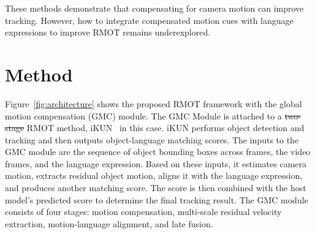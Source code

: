 \documentclass{article}
\makeatletter
\providecommand{\DIFadd}[1]{{\protect\color{blue}\uwave{#1}}} %
\providecommand{\DIFdel}[1]{{\protect\color{red}\sout{#1}}} %
\providecommand{\DIFaddbegin}{} %
\providecommand{\DIFaddend}{} %
\providecommand{\DIFdelbegin}{} %
\providecommand{\DIFdelend}{} %
\providecommand{\DIFscaledelfig}{0.5}
\newlength{\DIFdelgraphicswidth} %
\newlength{\DIFdelgraphicsheight} %
\providecommand{\DIFaddincludegraphics}[2][]{{\color{blue}\fbox{\DIFOincludegraphics[#1]{#2}}}} %
\providecommand{\DIFdelincludegraphics}[2][]{%
\sbox{\DIFdelgraphicsbox}{\DIFOincludegraphics[#1]{#2}}%
\settoboxwidth{\DIFdelgraphicswidth}{\DIFdelgraphicsbox} %
\settoboxtotalheight{\DIFdelgraphicsheight}{\DIFdelgraphicsbox} %
\scalebox{\DIFscaledelfig}{%
\parbox[b]{\DIFdelgraphicswidth}{\usebox{\DIFdelgraphicsbox}\\[-\baselineskip] \rule{\DIFdelgraphicswidth}{0em}}\llap{\resizebox{\DIFdelgraphicswidth}{\DIFdelgraphicsheight}{%
\setlength{\unitlength}{\DIFdelgraphicswidth}%
\begin{picture}(1,1)%
\thicklines\linethickness{2pt} %
{\color[rgb]{1,0,0}\put(0,0){\framebox(1,1){}}}%
{\color[rgb]{1,0,0}\put(0,0){\line( 1,1){1}}}%
{\color[rgb]{1,0,0}\put(0,1){\line(1,-1){1}}}%
\end{picture}%
}\hspace*{3pt}}} %
} %
\DeclareRobustCommand{\DIFaddbegin}{\DIFOaddbegin \let\includegraphics\DIFaddincludegraphics} %
\DeclareRobustCommand{\DIFaddend}{\DIFOaddend \let\includegraphics\DIFOincludegraphics} %
\DeclareRobustCommand{\DIFdelbegin}{\DIFOdelbegin \let\includegraphics\DIFdelincludegraphics} %
\DeclareRobustCommand{\DIFdelend}{\DIFOaddend \let\includegraphics\DIFOincludegraphics} %
\let\sout@orig\sout %
\renewcommand{\sout}[1]{\ifmmode\text{\sout@orig{\ensuremath{#1}}}\else\sout@orig{#1}\fi} %
\makeatother
\begin{document}
These methods demonstrate that compensating for camera motion can improve tracking. However, how to integrate compensated motion cues with language expressions to improve RMOT remains underexplored.

\DIFdelbegin %


\DIFdelend %


\section{Method}
\label{sec:method}
Figure~\ref{fig:architecture} shows the proposed RMOT framework with the global motion compensation (GMC) module. The GMC Module is attached to a \DIFdelbegin \DIFdel{two-stage }\DIFdelend \DIFaddbegin \DIFadd{host }\DIFaddend RMOT method, iKUN~\cite{ikun} in this case. iKUN performs object detection and tracking and then outputs object-language matching scores. The inputs to the GMC module are the sequence of object bounding boxes across frames, the video frames, and the language expression. Based on these inputs, it estimates camera motion, extracts residual object motion, aligns it with the language expression, and produces another matching score. The score is then combined with the host model's predicted score to determine the final tracking result. The GMC module consists of four stages: motion compensation, multi-scale residual velocity extraction, motion-language alignment, and late fusion.
\end{document}
